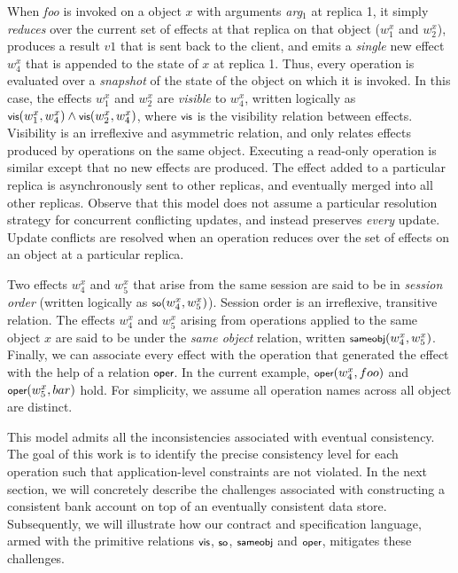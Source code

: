 When \emph{foo} is invoked on a object $x$ with arguments \emph{arg}$_1$ at
replica 1, it simply \emph{reduces} over the current set of effects at that
replica on that object ($w^x_1$ and $w^x_2$), produces a result $v1$ that is
sent back to the client, and emits a \emph{single} new effect $w^x_4$ that is
appended to the state of $x$ at replica 1. Thus, every operation is evaluated
over a \emph{snapshot} of the state of the object on which it is invoked. In
this case, the effects $w^x_1$ and $w^x_2$ are \emph{visible} to $w^x_4$,
written logically as $\small \vis{w^x_1}{w^x_4} \wedge \vis{w^x_2}{w^x_4}$,
where $\small \visZ$ is the visibility relation between effects. Visibility is
an irreflexive and asymmetric relation, and only relates effects produced by
operations on the same object. Executing a read-only operation is similar
except that no new effects are produced. The effect added to a particular
replica is asynchronously sent to other replicas, and eventually merged into
all other replicas. Observe that this model does not assume a particular
resolution strategy for concurrent conflicting updates, and instead preserves
\emph{every} update. Update conflicts are resolved when an operation reduces
over the set of effects on an object at a particular replica.

Two effects $w^x_4$ and $w^x_5$ that arise from the same session are said to be
in \emph{session order} (written logically as $\small \so{w^x_4}{w^x_5}$).
Session order is an irreflexive, transitive relation. The effects $w^x_4$ and
$w^x_5$ arising from operations applied to the same object $x$ are said to be
under the \emph{same object} relation, written $\small \sameobj{w^x_4}{w^x_5}$.
Finally, we can associate every effect with the operation that generated the
effect with the help of a relation $\small \operZ$. In the current example,
$\small \oper{w^x_4}{foo}$ and $\small \oper{w^x_5}{bar}$ hold. For simplicity,
we assume all operation names across all object are distinct.

This model admits all the inconsistencies associated with eventual consistency.
The goal of this work is to identify the precise consistency level for each
operation such that application-level constraints are not violated. In the next
section, we will concretely describe the challenges associated with
constructing a consistent bank account on top of an eventually consistent data
store. Subsequently, we will illustrate how our contract and specification
language, armed with the primitive relations $\small \visZ$, $\small \soZ$,
$\small \sameobjZ$ and $\small \operZ$, mitigates these challenges.
